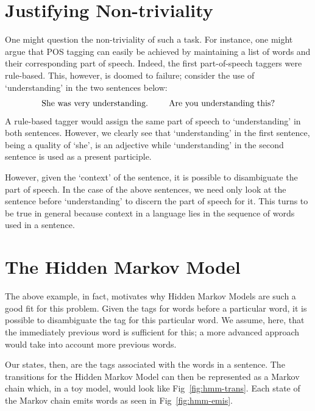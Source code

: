 \documentclass[11pt]{article}
\begin{document}
\section{Justifying Non-triviality}
One might question the non-triviality of such a task. For instance, one might argue that POS tagging can easily be achieved by maintaining a list of words and their corresponding part of speech. Indeed, the first part-of-speech taggers were rule-based. This, however, is doomed to failure; consider the use of `understanding' in the two sentences below:
%
$$\text{She was very understanding. \quad \quad Are you understanding this?}$$
%
A rule-based tagger would assign the same part of speech to `understanding' in both sentences. However, we clearly see that `understanding' in the first sentence, being a quality of `she', is an adjective while `understanding' in the second sentence is used as a present participle.

However, given the `context' of the sentence, it is possible to disambiguate the part of speech. In the case of the above sentences, we need only look at the sentence before `understanding' to discern the part of speech for it. This turns to be true in general because context in a language lies in the sequence of words used in a sentence.

\section{The Hidden Markov Model}
The above example, in fact, motivates why Hidden Markov Models are such a good fit for this problem. Given the tags for words before a particular word, it is possible to disambiguate the tag for this particular word. We assume, here, that the immediately previous word is sufficient for this; a more advanced approach would take into account more previous words.

Our states, then, are the tags associated with the words in a sentence. The transitions for the Hidden Markov Model can then be represented as a Markov chain which, in a toy model, would look like Fig~\ref{fig:hmm-trans}. Each state of the Markov chain emits words as seen in Fig~\ref{fig:hmm-emis}.
\end{document}
